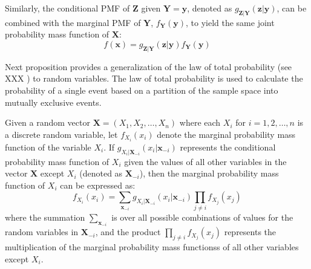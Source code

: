 Similarly, the conditional PMF of $\mathbf{Z}$ given $\mathbf{Y}=\mathbf{y}$, denoted as $g_{\mathbf{Z}|\mathbf{Y}}(\mathbf{z}|\mathbf{y})$, can be combined with the marginal PMF of $\mathbf{Y}$, $f_{\mathbf{Y}}(\mathbf{y})$, to yield the same joint probability mass function of $\mathbf{X}$:
\[
f(\mathbf{x}) = g_{\mathbf{Z}|\mathbf{Y}}(\mathbf{z}|\mathbf{y}) f_{\mathbf{Y}}(\mathbf{y})
\]

Next proposition provides a generalization of the law of total probability (see {\color{red} XXX }) to random variables. The law of total probability is used to calculate the probability of a single event based on a partition of the sample space into mutually exclusive events.

\begin{proposition}
Given a random vector $\mathbf{X} = (X_1, X_2, \ldots, X_n)$ where each $X_i$ for $i = 1, 2, \ldots, n$ is a discrete random variable, let $f_{X_i}(x_i)$ denote the marginal probability mass function of the variable $X_i$. If $g_{X_i|\mathbf{X}_{-i}}(x_i|\mathbf{x}_{-i})$ represents the conditional probability mass function of $X_i$ given the values of all other variables in the vector $\mathbf{X}$ except $X_i$ (denoted as $\mathbf{X}_{-i}$), then the marginal probability mass function of $X_i$ can be expressed as:
\[ f_{X_i}(x_i) = \sum_{\mathbf{x}_{-i}} g_{X_i|\mathbf{X}_{-i}}(x_i|\mathbf{x}_{-i}) \prod_{j \neq i} f_{X_j}(x_j) \]
where the summation $\sum_{\mathbf{x}_{-i}}$ is over all possible combinations of values for the random variables in $\mathbf{X}_{-i}$, and the product $\prod_{j \neq i} f_{X_j}(x_j)$ represents the multiplication of the marginal probability mass functionss of all other variables except $X_i$.
\end{proposition}
